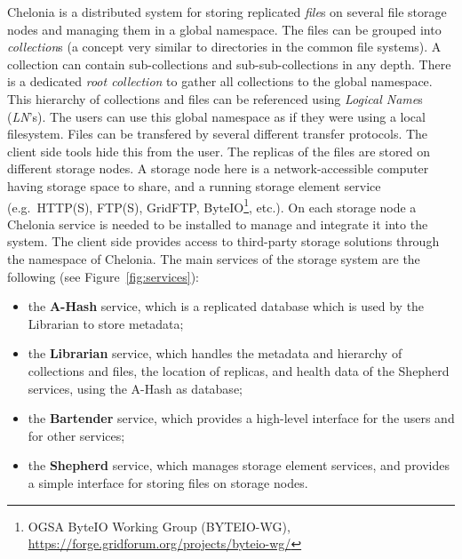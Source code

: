 \documentclass{book}
\begin{document}
Chelonia is a distributed system for storing replicated \emph{file}s on several file storage nodes and managing them in a global namespace.  The files can be grouped into \emph{collection}s (a concept very similar to directories in the common file systems). A collection can contain sub-collections and sub-sub-collections in any depth. There is a dedicated \emph{root collection} to gather all collections to the global namespace. This hierarchy of collections and files can be referenced using \emph{Logical Name}s (\emph{LN}'s). The users can use this global namespace as if they were using a local filesystem. Files can be transfered by several different transfer protocols. The client side tools hide this from the user. The replicas of the files are stored on different storage nodes. A storage node here is a network-accessible computer having storage space to share, and a running storage element service (e.g.~HTTP(S), FTP(S), GridFTP, ByteIO\footnote{OGSA ByteIO Working Group (BYTEIO-WG), \url{https://forge.gridforum.org/projects/byteio-wg/}}, etc.). On each storage node a Chelonia service is needed to be installed to manage and integrate it into the system. The client side provides access to third-party storage solutions through the namespace of Chelonia. The main services of the storage system are the following (see Figure~\ref{fig:services}):
\begin{itemize}
    \item the \textbf{A-Hash} service, which is a replicated database which is used by the Librarian to store metadata;
    \item the \textbf{Librarian} service, which handles the metadata and hierarchy of collections and files, the location of replicas, and health data of the Shepherd services, using the A-Hash as database;
    \item the \textbf{Bartender} service, which provides a high-level interface for the users and for other services;
    \item the \textbf{Shepherd} service, which manages storage element services, and provides a simple interface for storing files on storage nodes.
\end{itemize}
\end{document}
